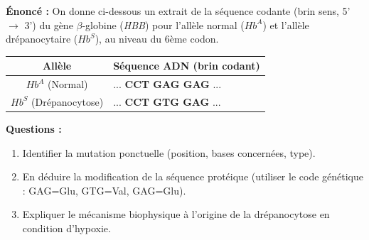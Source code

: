 \documentclass[11pt]{article}
\begin{document}
\begin{exoresolu}
    \textbf{Énoncé :} On donne ci-dessous un extrait de la séquence codante (brin sens, 5' $\rightarrow$ 3') du gène $\beta$-globine (\emph{HBB}) pour l'allèle normal ($Hb^A$) et l'allèle drépanocytaire ($Hb^S$), au niveau du 6ème codon.
    \begin{center}
    \begin{tabular}{|c|l|}\hline
    \rowcolor{popblueL}
    \textbf{Allèle} & \textbf{Séquence ADN (brin codant)} \\ \hline
    $Hb^A$ (Normal) & ... \textbf{CCT GAG GAG} ... \\ \hline
    $Hb^S$ (Drépanocytose) & ... \textbf{CCT GTG GAG} ... \\ \hline
    \end{tabular}
    \end{center}
    \textbf{Questions :}
    \begin{enumerate}
        \item Identifier la mutation ponctuelle (position, bases concernées, type).
        \item En déduire la modification de la séquence protéique (utiliser le code génétique : GAG=Glu, GTG=Val, GAG=Glu).
        \item Expliquer le mécanisme biophysique à l'origine de la drépanocytose en condition d'hypoxie.
    \end{enumerate}


\end{exoresolu}
\end{document}
